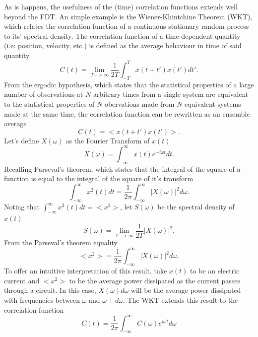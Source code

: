\documentclass[aps,prb,preprint,preprintnumbers,amsmath,amssymb,floatfix,superscriptaddress]{revtex4}
\begin{document}
As is happens, the usefulness of the (time) correlation functions extends well beyond the FDT. An simple example is the Wiener-Khintchine Theorem (WKT), which relates the correlation function of a continuous stationary random process to its' spectral density. The correlation function of a time-dependent quantity (i.e: position, velocity, etc.) is defined as the average behaviour in time of said quantity \cite{mcquarrie}
%
\begin{equation}
C(t)=\lim_{T->\infty}\frac{1}{2T}\int_{-T}^{T}x(t+t')x(t')dt'.
\end{equation}
%
From the ergodic hypothesis, which states that the statistical properties of a large number of observations at $N$ arbitrary times from a single system are equivalent to the statistical properties of $N$ obervations made from $N$ equivalent systems made at the same time, the correlation function can be rewritten as an ensemble average
%
\begin{equation}
C(t)=<x(t+t')x(t')>.
\end{equation}
%
Let's define $X(\omega)$ as the Fourier Transform of $x(t)$
%
\begin{equation}
X(\omega)=\int_{-\infty}^{\infty}x(t)e^{-i\omega t}dt.
\end{equation}
%
Recalling Parseval's theorem, which states that the integral of the square of a function is equal to the integral of the square of it's transform
%
\begin{equation}
\int_{-\infty}^{\infty}x^2(t)dt=\frac{1}{2\pi}\int_{-\infty}^{\infty}|X(\omega)|^2d\omega.
\end{equation}
%
Noting that $\int_{-\infty}^{\infty}x^2(t)dt=<x^2>$, let $S(\omega)$ be the spectral density of $x(t)$
%
\begin{equation}
S(\omega)=\lim_{T->\infty}\frac{1}{2T}|X(\omega)|^2.
\end{equation}
%
From the Parseval's theorem equality
%
\begin{equation}
<x^2>=\frac{1}{2\pi}\int_{-\infty}^{\infty}|X(\omega)|^2d\omega.
\end{equation}
%
To offer an intuitive interpretation of this result, take $x(t)$ to be an electric current and $<x^2>$ to be the average power dissipated as the current passes through a circuit. In this case, $X(\omega)d\omega$ will be the average power dissipated with frequencies between $\omega$ and $\omega+d\omega$. The WKT extends this result to the correlation function
%
\begin{equation}
C(t)=\frac{1}{2\pi}\int_{-\infty}^{\infty}C(\omega)e^{i\omega t}d\omega
\end{equation}
\end{document}

